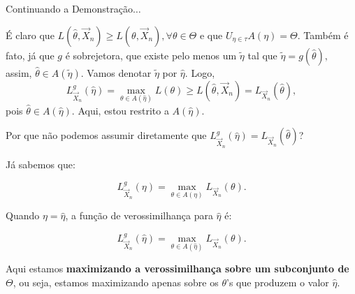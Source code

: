 \documentclass[12pt]{beamer}
\begin{document}
\begin{frame}{Continuando a Demonstração$\ldots$}
	\begin{block}{}
		\justifying
	É claro que $L(\hat{\theta},\vec{X}_{n})\geq L(\theta,\vec{X}_{n}), \forall \theta\in \Theta$ e que ${\displaystyle U_{\eta\in \tau}}A(\eta)=\Theta.$ Também é fato, já que $g$ é sobrejetora, que existe pelo menos um $\tilde{\eta}$ tal que $\tilde{\eta}=g(\hat{\theta}),$ assim, $\hat{\theta}\in A(\tilde{\eta}).$ Vamos denotar $\tilde{\eta}$ por $\hat{\eta}.$ Logo, $$L_{\vec{X}_{n}}^{g}(\hat{\eta})=\max_{\theta\in A(\hat{\eta})}L(\theta)\geq L(\hat{\theta},\vec{X}_{n})=L_{\vec{X}_{n}}(\hat{\theta}),$$ pois $\hat{\theta}\in A(\hat{\eta}).$ Aqui, estou restrito a $A(\hat{\eta}).$
	\end{block}
\end{frame}

\begin{frame}{Por que não podemos assumir diretamente que \( L_{\vec{X}_n}^{g}(\hat{\eta}) = L_{\vec{X}_n}(\hat{\theta}) \)?}
	\begin{block}{}
		\justifying
		
		Já sabemos que:
		
		\[
		L_{\vec{X}_n}^{g}(\eta) = \max_{\theta \in A(\eta)} L_{\vec{X}_n}(\theta).
		\]
		
		Quando \( \eta = \hat{\eta} \), a função de verossimilhança para \( \hat{\eta} \) é:
		
		\[
		L_{\vec{X}_n}^{g}(\hat{\eta}) = \max_{\theta \in A(\hat{\eta})} L_{\vec{X}_n}(\theta).
		\]
		
		Aqui estamos \textbf{maximizando a verossimilhança sobre um subconjunto de \( \Theta \)}, ou seja, estamos maximizando apenas sobre os \( \theta \)'s que produzem o valor \( \hat{\eta} \).
		
	\end{block}
\end{frame}
\end{document}

